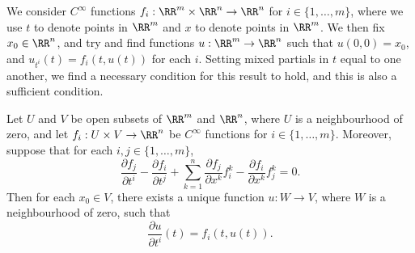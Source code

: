 We consider $C^\infty$ functions $f_i: \RR^m \times \RR^n \to \RR^n$ for $i \in \{ 1, \dots, m \}$, where we use $t$ to denote points in $\RR^m$ and $x$ to denote points in $\RR^m$. We then fix $x_0 \in \RR^n$, and try and find functions $u: \RR^m \to \RR^n$ such that $u(0,0) = x_0$, and $u_{t^i}(t) = f_i(t,u(t))$ for each $i$. Setting mixed partials in $t$ equal to one another, we find a necessary condition for this result to hold, and this is also a sufficient condition.

\begin{theorem}
    Let $U$ and $V$ be open subsets of $\RR^m$ and $\RR^n$, where $U$ is a neighbourhood of zero, and let $f_i: U \times V \to \RR^n$ be $C^\infty$ functions for $i \in \{ 1, \dots, m \}$. Moreover, suppose that for each $i,j \in \{ 1, \dots, m \}$,
    \[ \frac{\partial f_j}{\partial t^i} - \frac{\partial f_i}{\partial t^j} + \sum_{k = 1}^n \frac{\partial f_j}{\partial x^k} f_i^k - \frac{\partial f_i}{\partial x^k} f_j^k = 0. \]
    Then for each $x_0 \in V$, there exists a unique function $u: W \to V$, where $W$ is a neighbourhood of zero, such that
    \[ \frac{\partial u}{\partial t^i}(t) = f_i(t,u(t)). \]
\end{theorem}
